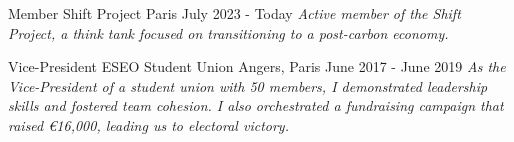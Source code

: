 \vspace{4pt}
\begin{cventries}

    \cventry
    {Member} %
    {Shift Project} %
    {Paris} %
    {July 2023 - Today} %
    {
        \textit{Active member of the Shift Project, a think tank focused on transitioning to a post-carbon economy.}
    }

    \vspace{2mm}

    \cventry
    {Vice-President} %
    {ESEO Student Union} %
    {Angers, Paris} %
    {June 2017 - June 2019} %
    {
        \textit{As the Vice-President of a student union with 50 members, I demonstrated leadership skills and fostered team cohesion. I also orchestrated a fundraising campaign that raised €16,000, leading us to electoral victory.}
    }
\end{cventries}
